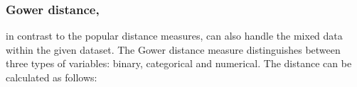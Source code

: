 	\subsubsection{Gower distance{\normalfont,}}\label{gower} in contrast to the popular distance measures, can also handle the mixed data within the given dataset. The Gower distance measure distinguishes between three types of variables: binary, categorical and numerical.
	The distance can be calculated as follows:
	
